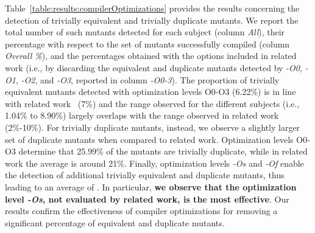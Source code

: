 Table~\ref{table:results:compilerOptimizations} provides the results concerning the detection of trivially equivalent and trivially duplicate mutants. We report the total number of such mutants detected for each subject (column \emph{All}), their percentage with respect to the set of mutants successfully compiled (column \emph{Overall \%}), and the percentages obtained with the options included in related work (i.e., by discarding the equivalent and duplicate mutants detected by \emph{-O0}, \emph{-O1}, \emph{-O2}, and \emph{-O3}, reported in column \emph{-O0-3}). 
 The proportion of trivially equivalent mutants detected with optimization levels O0-O3 (6.22\%) is in line with related work~\cite{papadakis2015trivial} (7\%) and the range observed for the different subjects (i.e., 1.04\% to 8.90\%) largely overlaps with the range observed in related work (2\%-10\%). 
 For trivially duplicate mutants, instead, we observe a slightly larger set of duplicate mutants when compared to related work. Optimization levels O0-O3 determine that 25.99\% of the mutants are trivially duplicate, while in related work the average is around 21\%. Finally,  
 optimization levels \emph{-Os} and \emph{-Of} enable the detection of additional trivially equivalent and duplicate mutants, thus leading to an average of . In particular, \textbf{we observe that the optimization level \emph{-Os}, not evaluated by related work, is the most effective}. Our results confirm the effectiveness of compiler optimizations for removing a significant percentage of equivalent and duplicate mutants.
 
